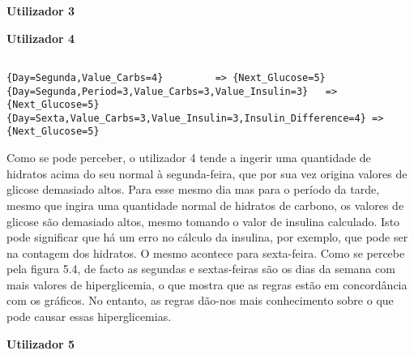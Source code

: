 \textbf{Utilizador 3}




\textbf{Utilizador 4}

\begin{lstlisting}

{Day=Segunda,Value_Carbs=4}         => {Next_Glucose=5}
{Day=Segunda,Period=3,Value_Carbs=3,Value_Insulin=3}   => {Next_Glucose=5}
{Day=Sexta,Value_Carbs=3,Value_Insulin=3,Insulin_Difference=4} => {Next_Glucose=5}
\end{lstlisting}

Como se pode perceber, o utilizador 4 tende a ingerir uma quantidade de hidratos acima do seu normal à segunda-feira, que por sua vez origina valores de glicose demasiado altos. Para esse mesmo dia mas para o período da tarde, mesmo que ingira uma quantidade normal de hidratos de carbono, os valores de glicose são demasiado altos, mesmo tomando o valor de insulina calculado. Isto pode significar que há um erro no cálculo da insulina, por exemplo, que pode ser na contagem dos hidratos. O mesmo acontece para sexta-feira. 
Como se percebe pela figura 5.4, de facto as segundas e sextas-feiras são os dias da semana com mais valores de hiperglicemia, o que mostra que as regras estão em concordância com os gráficos. No entanto, as regras dão-nos mais conhecimento sobre o que pode causar essas hiperglicemias.


\textbf{Utilizador 5}